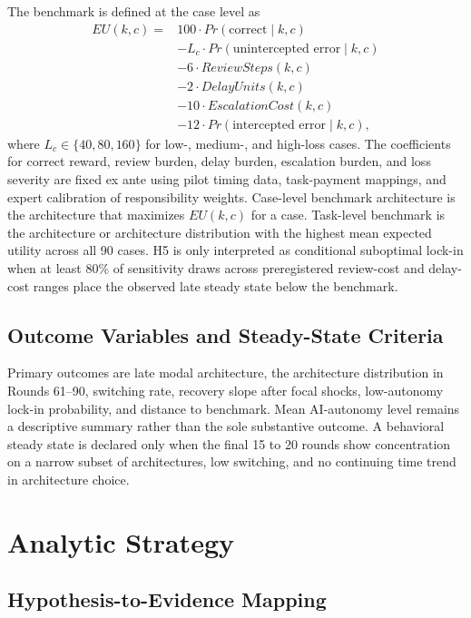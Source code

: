 \documentclass[man,natbib]{apa7}
\begin{document}
The benchmark is defined at the case level as
\begin{align*}
EU(k,c) ={}& 100 \cdot Pr(\text{correct}\mid k,c) \\
&- L_c \cdot Pr(\text{unintercepted error}\mid k,c) \\
&- 6 \cdot ReviewSteps(k,c) \\
&- 2 \cdot DelayUnits(k,c) \\
&- 10 \cdot EscalationCost(k,c) \\
&- 12 \cdot Pr(\text{intercepted error}\mid k,c),
\end{align*}
where $L_c \in \{40, 80, 160\}$ for low-, medium-, and high-loss cases. The coefficients for correct reward, review burden, delay burden, escalation burden, and loss severity are fixed ex ante using pilot timing data, task-payment mappings, and expert calibration of responsibility weights. Case-level benchmark architecture is the architecture that maximizes $EU(k,c)$ for a case. Task-level benchmark is the architecture or architecture distribution with the highest mean expected utility across all 90 cases. H5 is only interpreted as conditional suboptimal lock-in when at least 80\% of sensitivity draws across preregistered review-cost and delay-cost ranges place the observed late steady state below the benchmark.

\subsection{Outcome Variables and Steady-State Criteria}

Primary outcomes are late modal architecture, the architecture distribution in Rounds 61--90, switching rate, recovery slope after focal shocks, low-autonomy lock-in probability, and distance to benchmark. Mean AI-autonomy level remains a descriptive summary rather than the sole substantive outcome. A behavioral steady state is declared only when the final 15 to 20 rounds show concentration on a narrow subset of architectures, low switching, and no continuing time trend in architecture choice.

\section{Analytic Strategy}

\subsection{Hypothesis-to-Evidence Mapping}
\end{document}
